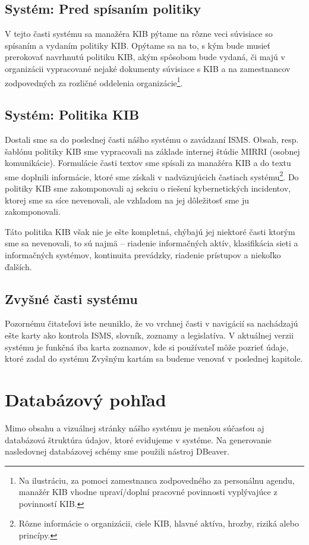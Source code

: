 \subsection*{Systém: Pred spísaním politiky} 
V tejto časti systému sa manažéra KIB pýtame na rôzne veci súvisiace so spísaním a vydaním
politiky KIB. Opýtame sa na to, s kým bude musieť prerokovať navrhnutú politiku KIB, akým spôsobom bude vydaná, či majú v
organizácii vypracované nejaké dokumenty súvisiace s KIB a na zamestnancov zodpovedných za rozličné oddelenia
organizácie\footnote{Na ilustráciu, za pomoci zamestnanca zodpovedného za personálnu agendu, manažér KIB vhodne
upraví/doplní pracovné povinnosti vyplývajúce z povinností KIB.}.

\subsection*{Systém: Politika KIB} 
Dostali sme sa do poslednej časti nášho systému o zavádzaní ISMS. Obsah, resp. šablónu politiky KIB sme vypracovali na
základe internej štúdie MIRRI (osobnej komunikácie)\cite{MIRRI-security-policy}. Formulácie časti textov sme spísali za
manažéra KIB a do textu sme doplnili informácie, ktoré sme získali v nadväzujúcich častiach systému\footnote{Rôzne
informácie o organizácii, ciele KIB, hlavné aktíva, hrozby, riziká alebo princípy.}. Do politiky KIB sme zakomponovali
aj sekciu o riešení kybernetických incidentov, ktorej sme sa síce nevenovali, ale vzhľadom na jej dôležitosť sme ju
zakomponovali.

Táto politika KIB však nie je ešte kompletná, chýbajú jej niektoré časti ktorým sme sa nevenovali, to sú najmä -- riadenie
informačných aktív, klasifikácia sieti a informačných systémov, kontinuita prevádzky, riadenie prístupov a niekoľko ďalších.

\subsection*{Zvyšné časti systému} 
Pozornému čitateľovi iste neuniklo, že vo vrchnej časti v navigácií sa nachádzajú ešte karty ako kontrola ISMS, slovník,
zoznamy a legislatíva. V aktuálnej verzii systému je funkčná iba karta zoznamov, kde si používateľ môže pozrieť údaje,
ktoré zadal do systému Zvyšným kartám sa budeme venovať v poslednej kapitole.

\section{Databázový pohľad}
Mimo obsahu a vizuálnej stránky nášho systému je menšou súčasťou aj databázová štruktúra údajov, ktoré evidujeme v systéme.
Na generovanie nasledovnej databázovej schémy sme použili nástroj DBeaver.

